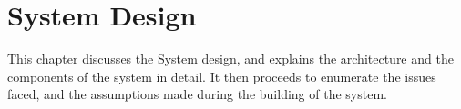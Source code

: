 \chapter{System Design}
This chapter discusses the System design, and explains the architecture and the components of the system in detail. It then proceeds to enumerate the issues faced, and the assumptions made during the building of the system. 



%
%


